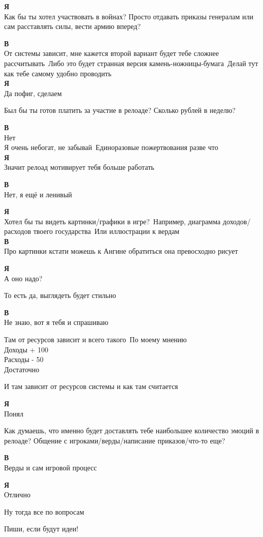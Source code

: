 \textbf{Я}\\
Как бы ты хотел участвовать в войнах? Просто отдавать приказы генералам или сам расставлять силы, вести армию вперед?

\textbf{В}\\
От системы зависит, мне кажется второй вариант будет тебе сложнее рассчитывать\
Либо это будет странная версия камень-ножницы-бумага\
Делай тут как тебе самому удобно проводить\\

\textbf{Я}\\
Да пофиг, сделаем

Был бы ты готов платить за участие в релоаде? Сколько рублей в неделю?

\textbf{В}\\
Нет\\
Я очень небогат, не забывай\
Единоразовые пожертвования разве что\\

\textbf{Я}\\
Значит релоад мотивирует тебя больше работать

\textbf{В}\\
Нет, я ещё и ленивый

\textbf{Я}\\
Хотел бы ты видеть картинки/графики в игре?\
Например, диаграмма доходов/расходов твоего государства\
Или иллюстрации к вердам\\

\textbf{В}\\
Про картинки кстати можешь к Ангине обратиться она превосходно рисует

\textbf{Я}\\
А оно надо?

То есть да, выглядеть будет стильно

\textbf{В}\\
Не знаю, вот я тебя и спрашиваю

Там от ресурсов зависит и всего такого\
По моему мнению\\
Доходы + 100\\
Расходы - 50\\
Достаточно

И там зависит от ресурсов системы и как там считается

\textbf{Я}\\
Понял

Как думаешь, что именно будет доставлять тебе наибольшее количество эмоций в релоаде? Общение с игроками/верды/написание приказов/что-то еще?

\textbf{В}\\
Верды и сам игровой процесс

\textbf{Я}\\
Отлично

Ну тогда все по вопросам

Пиши, если будут идеи!